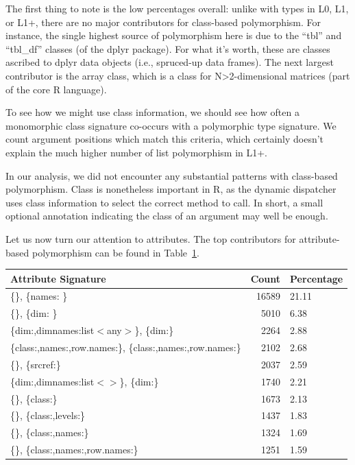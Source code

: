 \documentclass[acmsmall,10pt,review,anonymous]{acmart}\settopmatter{printfolios=true,printccs=false,printacmref=false}
\begin{document}
The first thing to note is the low percentages overall: unlike with types in L0, L1, or L1+, there are no major contributors for class-based polymorphism.
For instance, the single highest source of polymorphism here is due to the ``tbl'' and ``tbl\_df'' classes (of the dplyr package).
For what it's worth, these are classes ascribed to dplyr data objects (i.e., spruced-up data frames).
The next largest contributor is the array class, which is a class for N>2-dimensional matrices (part of the core R language).

To see how we might use class information, we should see how often a monomorphic class signature co-occurs with a polymorphic type signature.
We count \NUMPOLYTYPEMONOCLASS argument positions which match this criteria, which certainly doesn't explain the much higher number of list polymorphism in L1+.

In our analysis, we did not encounter any substantial patterns with class-based polymorphism.
Class is nonetheless important in R, as the dynamic dispatcher uses class information to select the correct method to call.
In short, a small optional annotation indicating the class of an argument may well be enough.

Let us now turn our attention to attributes.
The top contributors for attribute-based polymorphism can be found in Table~\ref{tab:topattrpoly}.

\begin{table}[ht]
\label{tab:topattrpoly}
\centering
\begin{tabular}{lrl}
  \hline
Attribute Signature & Count & Percentage \\
  \hline
\{\}, \{names: \C\} & 16589 & 21.11 \\
  \{\}, \{dim: \I\} & 5010 & 6.38 \\
  \{dim:\I,dimnames:list$<$any$>$\}, \{dim:\I\} & 2264 & 2.88 \\
  \{class:\C,names:\C,row.names:\C\}, \{class:\C,names:\C,row.names:\I\} & 2102 & 2.68 \\
  \{\}, \{srcref:\I\} & 2037 & 2.59 \\
  \{dim:\I,dimnames:list$<$\C$>$\}, \{dim:\I\} & 1740 & 2.21 \\
  \{\}, \{class:\C\} & 1673 & 2.13 \\
  \{\}, \{class:\C,levels:\C\} & 1437 & 1.83 \\
  \{\}, \{class:\C,names:\C\} & 1324 & 1.69 \\
  \{\}, \{class:\C,names:\C,row.names:\I\} & 1251 & 1.59 \\
   \hline
\end{tabular}
\end{table}
\end{document}
